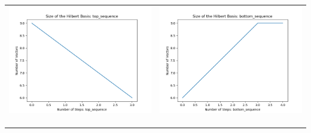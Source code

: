 \documentclass[10pt]{article}
\begin{document}
\begin{tabular}{c|c}
\begin{minipage}{.4\textwidth}
\includegraphics[width=\textwidth]{"DATA/5d/5 generators 1 bound D/top_sequence SIZE"}
\end{minipage} &
\begin{minipage}{.4\textwidth}
\includegraphics[width=\textwidth]{"DATA/5d/5 generators 1 bound D bottomup/bottom_sequence SIZE"}
\end{minipage} \\ \\
\hline \\\begin{minipage}{.4\textwidth}

\end{minipage}
\end{tabular}
\end{document}
